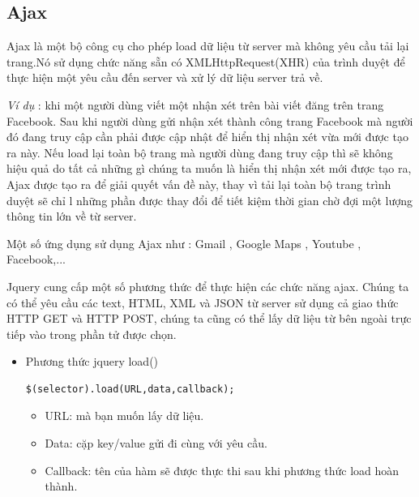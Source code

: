 \subsection{Ajax}
Ajax là một bộ công cụ cho phép load dữ liệu từ server mà không yêu cầu tải lại trang.Nó sử dụng chức năng sẵn có XMLHttpRequest(XHR) của trình duyệt để thực hiện một yêu cầu đến server và xử lý dữ liệu server trả về.
\par
\textit{Ví dụ} : khi một người dùng viết một nhận xét trên bài viết đăng trên trang Facebook. Sau khi người dùng gửi nhận xét thành công trang Facebook mà người đó đang truy cập cần phải được cập nhật để hiển thị nhận xét vừa mới được tạo ra này. Nếu load lại toàn bộ trang mà người dùng đang truy cập thì sẽ không hiệu quả do tất cả những gì chúng ta muốn là hiển thị nhận xét mới được tạo ra, Ajax được tạo ra để giải quyết vấn đề này, thay vì tải lại toàn bộ trang trình duyệt sẽ chỉ l những phần được thay đổi để tiết kiệm thời gian chờ đợi một lượng thông tin lớn về từ server.\par
Một số ứng dụng sử dụng Ajax như : Gmail , Google Maps , Youtube , Facebook,...\par
Jquery cung cấp một số phương thức để thực hiện các chức năng ajax. Chúng ta có thể yêu cầu các text, HTML, XML và JSON từ server sử dụng cả giao thức HTTP GET và HTTP POST, chúng ta cũng có thể lấy dữ liệu từ bên ngoài trực tiếp vào trong phần tử được chọn.
\begin{itemize}
\item  Phương thức jquery load()
\begin{lstlisting}
$(selector).load(URL,data,callback);
\end{lstlisting}
\begin{itemize}
\item URL: mà bạn muốn lấy dữ liệu.
\item Data: cặp key/value gửi đi cùng với yêu cầu.
\item Callback: tên của hàm sẽ được thực thi sau khi phương thức load hoàn thành.
\end{itemize}
\end{itemize}

 





